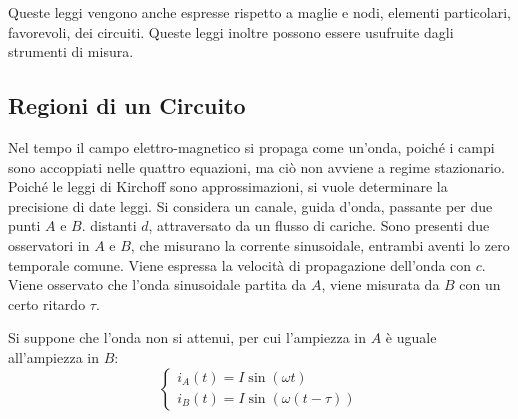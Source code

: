 \documentclass{article}
\numberwithin{equation}{subsection}
\begin{document}
Queste leggi vengono anche espresse rispetto a maglie e nodi, elementi particolari, favorevoli, dei circuiti. Queste leggi inoltre possono essere usufruite dagli strumenti di 
misura. 

\subsection{Regioni di un Circuito}

Nel tempo il campo elettro-magnetico si propaga come un'onda, poiché i campi sono accoppiati nelle quattro equazioni, ma ciò non avviene a regime stazionario. Poiché le leggi di 
Kirchoff sono approssimazioni, si vuole determinare la precisione di date leggi. Si considera un canale, guida d'onda, passante per due punti $A$ e $B$. distanti $d$, 
attraversato da un flusso di cariche. Sono presenti due osservatori in $A$ e $B$, che misurano la corrente sinusoidale, entrambi aventi lo zero temporale comune. Viene 
espressa la velocità di propagazione dell'onda con $c$. Viene osservato che l'onda sinusoidale partita da $A$, viene misurata da $B$ con un certo ritardo $\tau$. 

\begin{center}
\end{center}


Si suppone che l'onda non si attenui, per cui l'ampiezza in $A$ è uguale all'ampiezza in $B$: 
\begin{equation*}
    \begin{cases}
        i_A(t)=I\sin(\omega t)\\
        i_B(t)=I\sin(\omega(t-\tau))
    \end{cases}
\end{equation*}
\end{document}
